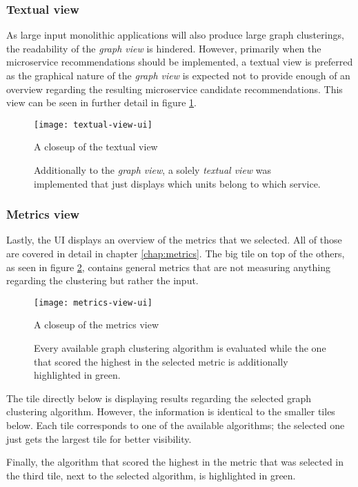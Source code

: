 \documentclass[12pt,a4paper]{report}
\begin{document}
\subsubsection{Textual view}
As large input monolithic applications will also
produce large graph clusterings, the readability of the \textit{graph view} is
hindered. However, primarily when the microservice recommendations should be
implemented, a textual view is preferred as the graphical nature of the \textit{
graph view} is expected not to provide enough of an overview regarding the
resulting microservice candidate recommendations. This view can be seen in
further detail in figure \ref{fig:textual-view-ui}.

\begin{figure}[htbp]
\centering
\texttt{[image: textual-view-ui]}
\caption{A closeup of the textual view}
\caption*{\centering
  Additionally to the \textit{graph view}, a solely \textit{textual view}
  was implemented that just displays which units belong to which service.
}
\label{fig:textual-view-ui}
\end{figure}

\subsubsection{Metrics view}
Lastly, the UI displays an overview of the metrics
that we selected. All of those are covered in detail in chapter
\ref{chap:metrics}. The big tile on top of the others, as seen in figure
\ref{fig:metrics-view-ui}, contains general metrics that are not measuring
anything regarding the clustering but rather the input.

\begin{figure}[htbp]
\centering
\texttt{[image: metrics-view-ui]}
\caption{A closeup of the metrics view}
\caption*{\centering
  Every available graph clustering algorithm is evaluated while the one that
  scored the highest in the selected metric is additionally highlighted in green.
}
\label{fig:metrics-view-ui}
\end{figure}

The tile directly below is displaying results regarding the selected graph
clustering algorithm. However, the information is identical to the smaller
tiles below. Each tile corresponds to one of the available algorithms; the
selected one just gets the largest tile for better visibility.

Finally, the algorithm that scored the highest in the metric that was selected
in the third tile, next to the selected algorithm, is highlighted in green.
\end{document}
